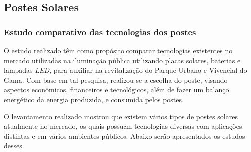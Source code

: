 \subsection{Postes Solares}

\subsubsection{Estudo comparativo das tecnologias dos postes}
	O estudo realizado têm como propósito comparar tecnologias existentes no mercado utilizadas na iluminação pública utilizando placas solares, baterias e lampadas \textit{LED}, para auxiliar na revitalização do Parque Urbano e Vivencial do Gama. Com base em tal pesquisa, realizou-se a escolha do poste, visando aspectos econômicos, financeiros e tecnológicos, além de fazer um balanço energético da energia produzida, e consumida pelos postes.

	O levantamento realizado mostrou que existem vários tipos de postes solares atualmente no mercado, os quais possuem  tecnologias diversas com aplicações distintas e em vários ambientes públicos.  Abaixo serão apresentados os estudos desses.

